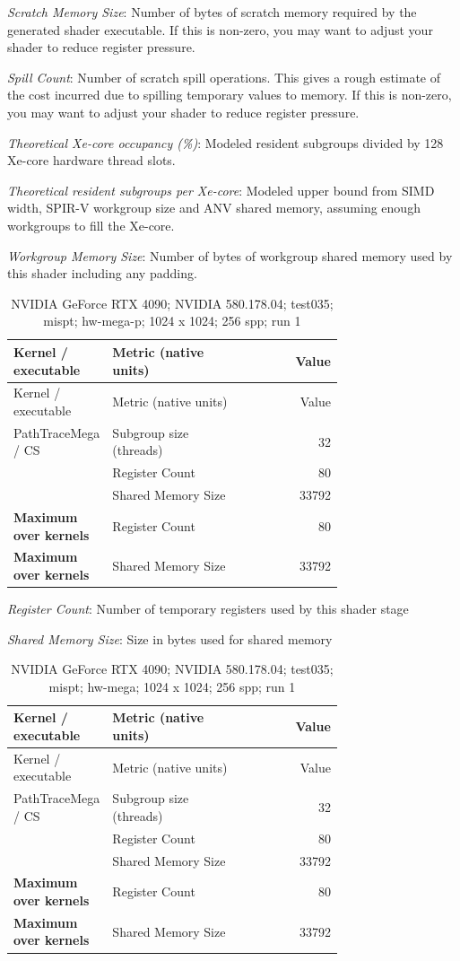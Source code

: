 \noindent\textit{Scratch Memory Size}: Number of bytes of scratch memory required by the generated shader executable.  If this is non-zero, you may want to adjust your shader to reduce register pressure.\par
\noindent\textit{Spill Count}: Number of scratch spill operations.  This gives a rough estimate of the cost incurred due to spilling temporary values to memory.  If this is non-zero, you may want to adjust your shader to reduce register pressure.\par
\noindent\textit{Theoretical Xe-core occupancy (\%)}: Modeled resident subgroups divided by 128 Xe-core hardware thread slots.\par
\noindent\textit{Theoretical resident subgroups per Xe-core}: Modeled upper bound from SIMD width, SPIR-V workgroup size and ANV shared memory, assuming enough workgroups to fill the Xe-core.\par
\noindent\textit{Workgroup Memory Size}: Number of bytes of workgroup shared memory used by this shader including any padding.\par
\begin{longtable}{p{0.30\linewidth}p{0.43\linewidth}r}
\caption{NVIDIA GeForce RTX 4090; NVIDIA 580.178.04; test035; mispt; hw-mega-p; 1024 x 1024; 256 spp; run 1}\label{tab:hydra-profile-10}\\
\hline Kernel / executable & Metric (native units) & Value \\\hline
\endfirsthead
\hline Kernel / executable & Metric (native units) & Value \\\hline
\endhead
PathTraceMega / CS & Subgroup size (threads) & 32 \\
 & Register Count & 80 \\
 & Shared Memory Size & 33792 \\
\hline
\textbf{Maximum over kernels} & Register Count & 80 \\
\textbf{Maximum over kernels} & Shared Memory Size & 33792 \\
\hline
\end{longtable}
\noindent\textit{Register Count}: Number of temporary registers used by this shader stage\par
\noindent\textit{Shared Memory Size}: Size in bytes used for shared memory\par
\begin{longtable}{p{0.30\linewidth}p{0.43\linewidth}r}
\caption{NVIDIA GeForce RTX 4090; NVIDIA 580.178.04; test035; mispt; hw-mega; 1024 x 1024; 256 spp; run 1}\label{tab:hydra-profile-11}\\
\hline Kernel / executable & Metric (native units) & Value \\\hline
\endfirsthead
\hline Kernel / executable & Metric (native units) & Value \\\hline
\endhead
PathTraceMega / CS & Subgroup size (threads) & 32 \\
 & Register Count & 80 \\
 & Shared Memory Size & 33792 \\
\hline
\textbf{Maximum over kernels} & Register Count & 80 \\
\textbf{Maximum over kernels} & Shared Memory Size & 33792 \\
\hline
\end{longtable}
